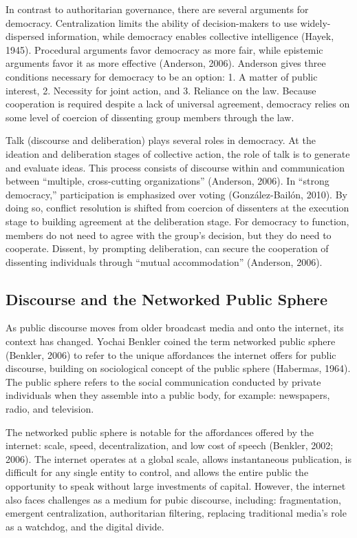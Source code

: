 In contrast to authoritarian governance, there are several arguments for democracy. Centralization limits the ability of decision-makers to use widely-dispersed information, while democracy enables collective intelligence (Hayek, 1945). Procedural arguments favor democracy as more fair, while epistemic arguments favor it as more effective (Anderson, 2006). Anderson gives three conditions necessary for democracy to be an option: 1. A matter of public interest, 2. Necessity for joint action, and 3. Reliance on the law. Because cooperation is required despite a lack of universal agreement, democracy relies on some level of coercion of dissenting group members through the law.

Talk (discourse and deliberation) plays several roles in democracy. At the ideation and deliberation stages of collective action, the  role of talk is to generate and evaluate ideas. This process consists of discourse within and communication between ``multiple, cross-cutting organizations'' (Anderson, 2006). In ``strong democracy,'' participation is emphasized over voting (Gonz\'alez-Bail\'on, 2010). By doing so, conflict resolution is shifted from coercion of dissenters at the execution stage to building agreement at the deliberation stage. For democracy to function, members do not need to agree with the group's decision, but they do need to cooperate. Dissent, by prompting deliberation, can secure the cooperation of dissenting individuals through ``mutual accommodation'' (Anderson, 2006).

\subsection{Discourse and the Networked Public Sphere}\label{sec:discourse}
As public discourse moves from older broadcast media and onto the internet, its context has changed. Yochai Benkler coined the term networked public sphere (Benkler, 2006) to refer to the unique affordances the internet offers for public discourse, building on sociological concept of the public sphere (Habermas, 1964). The public sphere refers to the social communication conducted by private individuals when they assemble into a public body, for example: newspapers, radio, and television.

The networked public sphere is notable for the affordances offered by the internet: scale, speed, decentralization, and low cost of speech (Benkler, 2002; 2006). The internet operates at a global scale, allows instantaneous publication, is difficult for any single entity to control, and allows the entire public the opportunity to speak without large investments of capital. However, the internet also faces challenges as a medium for pubic discourse, including: fragmentation, emergent centralization, authoritarian filtering, replacing traditional media's role as a watchdog, and the digital divide.

